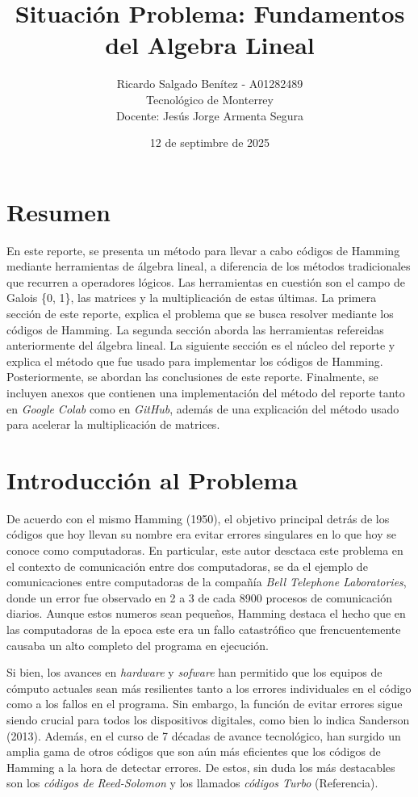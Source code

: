 \documentclass{article}
\title{Situación Problema: Fundamentos del Algebra Lineal}
\author{Ricardo Salgado Benítez - A01282489 \\ Tecnológico de Monterrey \\ Docente: Jesús Jorge Armenta Segura}
\date{12 de septimbre de 2025}
\begin{document}
\maketitle
\newpage
\section{Resumen}

En este reporte, se presenta un método para llevar a cabo códigos de Hamming mediante herramientas de álgebra lineal, a diferencia de los métodos tradicionales que recurren a operadores lógicos. Las herramientas en cuestión son el campo de Galois \{0, 1\}, las matrices y la multiplicación de estas últimas. La primera sección de este reporte, explica el problema que se busca resolver mediante los códigos de Hamming. La segunda sección aborda las herramientas refereidas anteriormente del álgebra lineal. La siguiente sección es el núcleo del reporte y explica el método que fue usado para implementar los códigos de Hamming. Posteriormente, se abordan las conclusiones de este reporte. Finalmente, se incluyen anexos que contienen una implementación del método del reporte tanto en \textit{Google Colab} como en \textit{GitHub}, además de una explicación del método usado para acelerar la multiplicación de matrices.

\section{Introducción al Problema}

De acuerdo con el mismo Hamming (1950), el objetivo principal detrás de los códigos que hoy llevan su nombre era evitar errores singulares en lo que hoy se conoce como computadoras. En particular, este autor desctaca este problema en el contexto de comunicación entre dos computadoras, se da el ejemplo de comunicaciones entre computadoras de la compañía \textit{Bell Telephone Laboratories}, donde un error fue observado en 2 a 3 de cada 8900 procesos de comunicación diarios. Aunque estos numeros sean pequeños, Hamming destaca el hecho que en las computadoras de la epoca este era un fallo catastrófico que frencuentemente causaba un alto completo del programa en ejecución.

Si bien, los avances en \textit{hardware} y \textit{sofware} han permitido que los equipos de cómputo actuales sean más resilientes tanto a los errores individuales en el código como a los fallos en el programa. Sin embargo, la función de evitar errores sigue siendo crucial para todos los dispositivos digitales, como bien lo indica Sanderson (2013). Además, en el curso de 7 décadas de avance tecnológico, han surgido un amplia gama de otros códigos que son aún más eficientes que los códigos de Hamming a la hora de detectar errores. De estos, sin duda los más destacables son los \textit{códigos de Reed-Solomon} y los llamados \textit{códigos Turbo} (Referencia).
\end{document}
